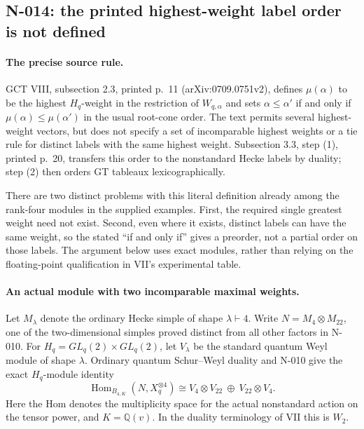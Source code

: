 \subsection{N-014: the printed highest-weight label order is not defined}
\label{sec:nonstandard-label-order}

\paragraph{The precise source rule.}
GCT VIII, subsection 2.3, printed p.~11
(arXiv:0709.0751v2), defines $\mu(\alpha)$ to be the highest
$H_q$-weight in the restriction of $W_{q,\alpha}$ and sets
$\alpha\le\alpha'$ if and only if
$\mu(\alpha)\le\mu(\alpha')$ in the usual root-cone order.
The text permits several highest-weight vectors, but does not
specify a set of incomparable highest weights or a tie rule
for distinct labels with the same highest weight.
Subsection 3.3, step (1), printed p.~20, transfers this order
to the nonstandard Hecke labels by duality; step (2) then
orders GT tableaux lexicographically.

There are two distinct problems with this literal definition
already among the rank-four modules in the supplied examples.
First, the required single greatest weight need not exist.
Second, even where it exists, distinct labels can have the same
weight, so the stated ``if and only if'' gives a preorder,
not a partial order on those labels.  The argument below
uses exact modules, rather than relying on the floating-point
qualification in VII's experimental table.

\paragraph{An actual module with two incomparable maximal weights.}
Let $M_\lambda$ denote the ordinary Hecke simple of shape
$\lambda\vdash4$.  Write $N=M_4\otimes M_{22}$, one of the
two-dimensional simples proved distinct from all other factors
in N-010.  For $H_q=GL_q(2)\times GL_q(2)$, let $V_\lambda$
be the standard quantum Weyl module of shape $\lambda$.
Ordinary quantum Schur--Weyl duality and N-010 give the exact
$H_q$-module identity
\[
 \operatorname{Hom}_{B_{4,K}}(N,X_q^{\otimes4})
       \cong V_4\otimes V_{22}\ \oplus\ V_{22}\otimes V_4.
 \tag{N-53}
\]
Here the Hom denotes the multiplicity space for the actual
nonstandard action on the tensor power, and $K=\mathbb Q(v)$.
In the duality terminology of VII this is $W_2$.

